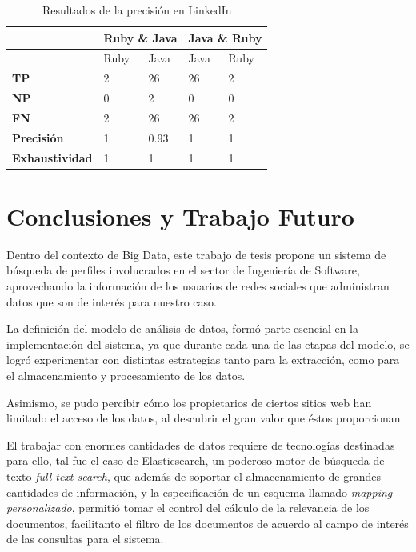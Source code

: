 \begin{center}
\begin{table}[H] 
\centering
\begin{tabular}{|p{3cm} p{2cm} p{2cm} p{2cm} p{2cm}|}
\hline
& \multicolumn{2}{c}{\textbf{Ruby \& Java}} & \multicolumn{2}{c|}{\textbf{Java \& Ruby}} \\ \hline
 & Ruby & Java & Java & Ruby \\
\hline \hline 
\textbf{TP} & 2 & 26 & 26 & 2 \\ \hline
\textbf{NP} & 0 & 2  & 0 & 0 \\ \hline
\textbf{FN} & 2 & 26  & 26 & 2 \\ \hline
\textbf{Precisión} & 1 & 0.93 & 1 & 1\\ \hline
\textbf{Exhaustividad} & 1 & 1  & 1 & 1 \\ \hline
\end{tabular}
\caption{Resultados de la precisión en LinkedIn}
\label{tabla:Tabla de Resultados}
\end{table}
\end{center}


\chapter{Conclusiones y Trabajo Futuro}
\label{chap:conytf}

Dentro del contexto de Big Data, este trabajo de tesis propone un sistema de búsqueda de perfiles involucrados en el sector de Ingeniería de Software, aprovechando la información de los usuarios de redes sociales que administran datos que son de interés para nuestro caso.

La definición del modelo de análisis de datos, formó parte esencial en la implementación del sistema, ya que durante cada una de las etapas del modelo, se logró experimentar con distintas estrategias tanto para la extracción, como para el almacenamiento y procesamiento de los datos.

Asimismo, se pudo percibir cómo los propietarios de ciertos sitios web han limitado el acceso de los datos, al descubrir el gran valor que éstos proporcionan.

El trabajar con enormes cantidades de datos requiere de tecnologías destinadas para ello, tal fue el caso de Elasticsearch, un poderoso motor de búsqueda de texto \textit{full-text search}, que además de soportar el almacenamiento de grandes cantidades de información, y  la especificación de un esquema llamado \textit{mapping personalizado}, permitió tomar el control del cálculo de la relevancia de los documentos, facilitanto el filtro de los documentos de acuerdo al campo de inter\'es de las consultas para el sistema.

